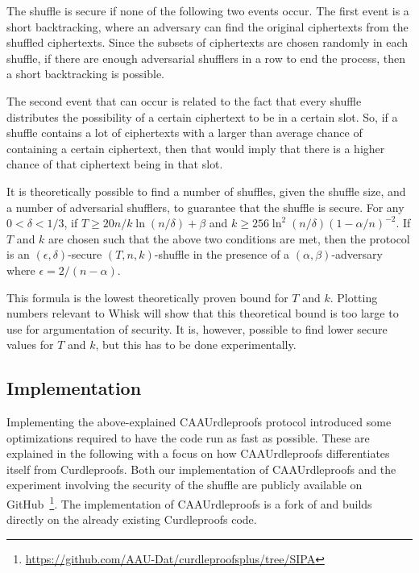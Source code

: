 The shuffle is secure if none of the following two events occur.
The first event is a short backtracking, where an adversary can find the original ciphertexts from the shuffled ciphertexts.
Since the subsets of ciphertexts are chosen randomly in each shuffle, if there are enough adversarial shufflers in a row to end the process, then a short backtracking is possible.

The second event that can occur is related to the fact that every shuffle distributes the possibility of a certain ciphertext to be in a certain slot.
So, if a shuffle contains a lot of ciphertexts with a larger than average chance of containing a certain ciphertext, then that would imply that there is a higher chance of that ciphertext being in that slot.

It is theoretically possible to find a number of shuffles, given the shuffle size, and a number of adversarial shufflers, to guarantee that the shuffle is secure.
For any $0 < \delta < 1/3$, if $T \geq 20 n / k \ln(n/\delta) + \beta $ and $ k \geq 256 \ln^2(n/\delta)(1 - \alpha/n)^{-2}$.
If $T$ and $k$ are chosen such that the above two conditions are met, then the protocol is an $(\epsilon , \delta)$-secure $(T,n,k)$-shuffle in the presence of a $(\alpha, \beta)$-adversary where $\epsilon = 2/(n-\alpha)$.

This formula is the lowest theoretically proven bound for $T$ and $k$.
Plotting numbers relevant to Whisk will show that this theoretical bound is too large to use for argumentation of security.
It is, however, possible to find lower secure values for $T$ and $k$, but this has to be done experimentally.


\subsection{Implementation}\label{subsec:approach-implementation}
Implementing the above-explained CAAUrdleproofs protocol introduced some optimizations required to have the code run as fast as possible.
These are explained in the following with a focus on how CAAUrdleproofs differentiates itself from Curdleproofs.
Both our implementation of CAAUrdleproofs and the experiment involving the security of the shuffle are publicly available on GitHub~\footnote{\href{https://github.com/AAU-Dat/curdleproofsplus/tree/SIPA}{https://github.com/AAU-Dat/curdleproofsplus/tree/SIPA}}.
The implementation of CAAUrdleproofs is a fork of and builds directly on the already existing Curdleproofs code.
